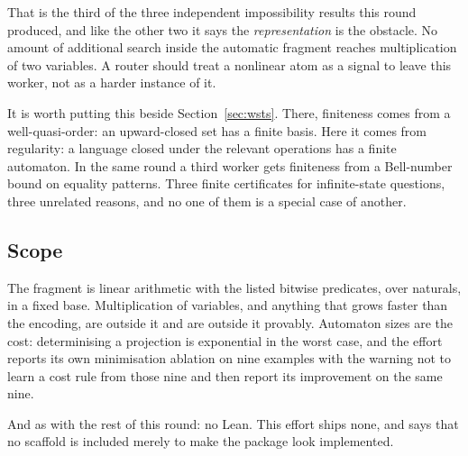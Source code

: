 That is the third of the three independent impossibility results this round
produced, and like the other two it says the \emph{representation} is the
obstacle. No amount of additional search inside the automatic fragment reaches
multiplication of two variables. A router should treat a nonlinear atom as a
signal to leave this worker, not as a harder instance of it.

\begin{remark}
It is worth putting this beside Section~\ref{sec:wsts}. There, finiteness comes
from a well-quasi-order: an upward-closed set has a finite basis. Here it comes
from regularity: a language closed under the relevant operations has a finite
automaton. In the same round a third worker gets finiteness from a Bell-number
bound on equality patterns. Three finite certificates for infinite-state
questions, three unrelated reasons, and no one of them is a special case of
another.
\end{remark}

\subsection{Scope}

The fragment is linear arithmetic with the listed bitwise predicates, over
naturals, in a fixed base. Multiplication of variables, and anything that grows
faster than the encoding, are outside it and are outside it provably. Automaton
sizes are the cost: determinising a projection is exponential in the worst case,
and the effort reports its own minimisation ablation on nine examples with the
warning not to learn a cost rule from those nine and then report its improvement
on the same nine.

And as with the rest of this round: no Lean. This effort ships none, and says
that no scaffold is included merely to make the package look implemented.
